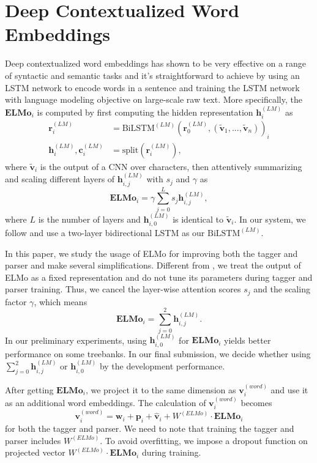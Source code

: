 \documentclass[11pt,a4paper]{article}
\begin{document}
\section{Deep Contextualized Word Embeddings}\label{sec:elmo}

Deep contextualized word embeddings \citep[ELMo]{N18-1202}
has shown to
be very effective on a range of syntactic and semantic tasks
and it's straightforward to achieve by
using an LSTM network to encode words in a sentence
and training the LSTM network with language modeling objective
on large-scale raw text.
More specifically, the $\mathbf{ELMo}_i$ is computed
by first computing the hidden representation $\mathbf{h}_i^{(LM)}$ as
\begin{align*}
\mathbf{r}_i^{(LM)} & =  \text{BiLSTM}^{(LM)}(\mathbf{r}_0^{(LM)}, (\mathbf{\tilde{v}}_1, ..., \mathbf{\tilde{v}}_n))_i \\
\mathbf{h}_i^{(LM)}, \mathbf{c}_i^{(LM)} & = \text{split}(\mathbf{r}_i^{(LM)})\text{,}
\end{align*}
where $\mathbf{\tilde{v}}_i$ is the output of a CNN over characters,
then attentively summarizing and scaling different layers of  $\mathbf{h}_{i, j}^{(LM)}$
with $s_j$ and $\gamma$
as
\[
\mathbf{ELMo}_i = \gamma \sum_{j=0}^L s_j \mathbf{h}_{i, j}^{(LM)},
\]
where $L$ is the number of layers and $\mathbf{h}_{i, 0}^{(LM)}$ is identical to $\mathbf{\tilde{v}}_i$.
In our system, we follow \citet{N18-1202} and use a two-layer bidirectional LSTM as our $\text{BiLSTM}^{(LM)}$.

In this paper, we study the usage of ELMo for improving both
the tagger and parser and make several simplifications.
Different from \citet{N18-1202}, we treat the output of ELMo as a fixed representation
and do not tune its parameters during tagger and parser training.
Thus, we cancel the layer-wise attention scores $s_j$ and the scaling factor $\gamma$, 
which means
\[
\mathbf{ELMo}_i = \sum_{j=0}^{2} \mathbf{h}_{i, j}^{(LM)}.
\]
In our preliminary experiments, using $ \mathbf{h}_{i, 0}^{(LM)}$ for $\mathbf{ELMo}_i$
yields better performance on some treebanks.
In our final submission, we decide whether using $\sum_{j=0}^{2} \mathbf{h}_{i, j}^{(LM)}$
or $ \mathbf{h}_{i, 0}^{(LM)}$ by the development performance.

After getting $\mathbf{ELMo}_i$, we project it
to the same dimension as $\mathbf{v}_i^{(word)}$ and
use it as an additional word embeddings.
The calculation of $\mathbf{v}_i^{(word)}$ becomes
\[
\mathbf{v}_i^{(word)} = \mathbf{w}_i + \mathbf{p}_i + \mathbf{\hat{v}}_i + W^{(ELMo)} \cdot \mathbf{ELMo}_i
\]
for both the tagger and parser.
We need to note that training the tagger and parser includes $W^{(ELMo)}$.
To avoid overfitting, we impose a dropout function on projected vector
$W^{(ELMo)} \cdot \mathbf{ELMo}_i$
during training.
\end{document}
